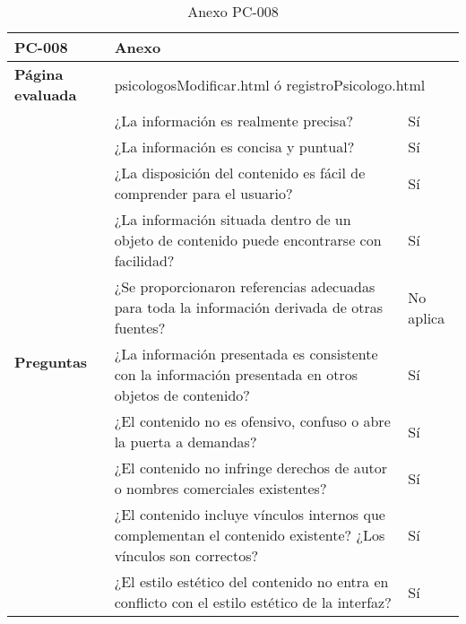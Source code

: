 \begin{table}[htpb]
\centering
\begin{tabularx}{\textwidth}{|l|X|l|}
\hline
\rowcolor[gray]{0.9}\textbf{PC-008}                       & \multicolumn{2}{l|}{Anexo}                                                                                                \\ \hline
\textbf{Página evaluada}             & \multicolumn{2}{l|}{psicologosModificar.html ó registroPsicologo.html}                                    \\ \hline
\multirow{10}{*}{\textbf{Preguntas}} & ¿La información es realmente precisa?                                                                         & Sí        \\ \cline{2-3} 
                                     & ¿La información es concisa y puntual?                                                                         & Sí        \\ \cline{2-3} 
                                     & ¿La disposición del contenido es fácil de comprender para el usuario?                                         & Sí        \\ \cline{2-3} 
                                     & ¿La información situada dentro de un objeto de contenido puede encontrarse con facilidad?                     & Sí        \\ \cline{2-3} 
                                     & ¿Se proporcionaron referencias adecuadas para toda la información derivada de otras fuentes?                  & No aplica \\ \cline{2-3} 
                                     & ¿La información presentada es consistente con la información presentada en otros objetos de contenido?        & Sí        \\ \cline{2-3} 
                                     & ¿El contenido no es ofensivo, confuso o abre la puerta a demandas?                                            & Sí        \\ \cline{2-3} 
                                     & ¿El contenido no infringe derechos de autor o nombres comerciales existentes?                                 & Sí        \\ \cline{2-3} 
                                     & ¿El contenido incluye vínculos internos que complementan el contenido existente? ¿Los vínculos son correctos? & Sí        \\ \cline{2-3} 
                                     & ¿El estilo estético del contenido no entra en conflicto con el estilo estético de la interfaz?                & Sí        \\ \hline
\end{tabularx}
\caption{Anexo PC-008}
\end{table}


